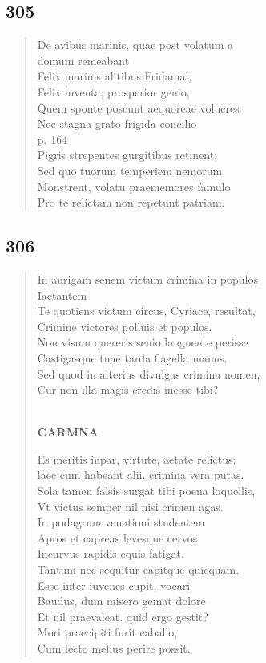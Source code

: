 \documentclass[11pt, a4paper]{report}
\begin{document}
            \subsection*{305}
      \begin{verse}
      De avibus marinis, quae post volatum a \\ domum remeabant \\ Felix marinis alitibus Fridamal, \\ Felix iuventa, prosperior genio, \\ Quem sponte poscunt aequoreae volucres \\ Nec stagna grato frigida concilio \\ p. 164 \\ Pigris strepentes gurgitibus retinent; \\ Sed quo tuorum temperiem nemorum \\ Monstrent, volatu praememores famulo \\ Pro te relictam non repetunt patriam. \\ 
      \end{verse}
  
            \subsection*{306}
      \begin{verse}
      In aurigam senem victum crimina in populos \\ Iactantem \\ Te quotiens victum circus, Cyriace, resultat, \\ Crimine victores polluis et populos. \\ Non visum quereris senio languente perisse \\ Castigasque tuae tarda flagella manus. \\ Sed quod in alterius divulgas crimina nomen, \\ Cur non illa magis credis inesse tibi? \\ 
        ﻿\pagebreak 
    \begin{center} \textbf{CARMNA} \end{center} \marginpar{[258]} Es meritis inpar, virtute, aetate relictus: \\ laec cum habeant alii, crimina vera putas. \\ Sola tamen falsis surgat tibi poena loquellis, \\ Vt victus semper nil nisi crimen agas. \\ In podagrum venationi studentem \\ Apros et capreas levesque cervos \\ Incurvus rapidis equis fatigat. \\ Tantum nec sequitur capitque quicquam. \\ Esse inter iuvenes cupit, vocari \\ Baudus, dum misero gemat dolore \\ Et nil praevaleat. quid ergo gestit? \\ Mori praecipiti furit caballo, \\ Cum lecto melius perire possit. \\ 
      \end{verse}
  
\end{document}
